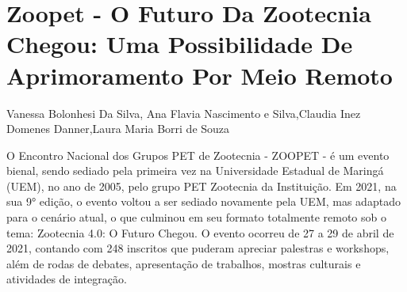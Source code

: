 


\section*{Zoopet - O Futuro Da Zootecnia Chegou: Uma Possibilidade De Aprimoramento Por Meio  Remoto}

Vanessa Bolonhesi Da Silva, Ana Flavia Nascimento e Silva,Claudia Inez  Domenes Danner,Laura Maria Borri de Souza

O Encontro Nacional dos Grupos PET de Zootecnia - ZOOPET - é um evento bienal, sendo sediado pela primeira vez na Universidade Estadual de Maringá (UEM), no ano de 2005, pelo grupo PET Zootecnia da Instituição. Em 2021, na sua 9° edição, o evento voltou a ser sediado novamente pela UEM, mas adaptado para o cenário atual, o que culminou em seu formato totalmente remoto sob o tema: Zootecnia 4.0: O Futuro Chegou. O evento ocorreu de 27 a 29 de abril de 2021, contando com 248 inscritos que puderam apreciar palestras e workshops, além de rodas de debates, apresentação de trabalhos, mostras culturais e atividades de integração.





